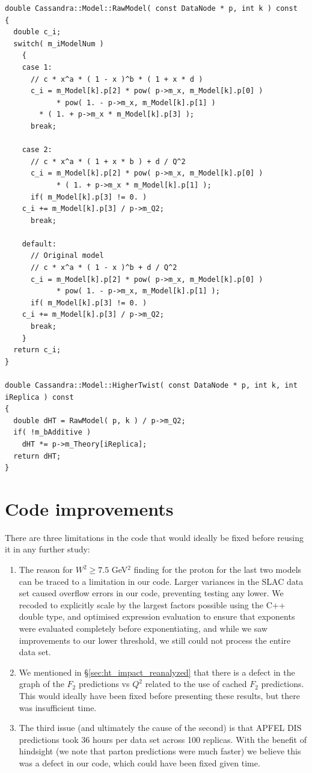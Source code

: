 \documentclass[12pt,a4paper]{report}
\begin{document}
\begin{Verbatim}[fontsize=\small]
double Cassandra::Model::RawModel( const DataNode * p, int k ) const
{
  double c_i;
  switch( m_iModelNum )
    {
    case 1:
      // c * x^a * ( 1 - x )^b * ( 1 + x * d )
      c_i = m_Model[k].p[2] * pow( p->m_x, m_Model[k].p[0] )
            * pow( 1. - p->m_x, m_Model[k].p[1] )
	    * ( 1. + p->m_x * m_Model[k].p[3] );
      break;

    case 2:
      // c * x^a * ( 1 + x * b ) + d / Q^2
      c_i = m_Model[k].p[2] * pow( p->m_x, m_Model[k].p[0] )
            * ( 1. + p->m_x * m_Model[k].p[1] );
      if( m_Model[k].p[3] != 0. )
	c_i += m_Model[k].p[3] / p->m_Q2;
      break;

    default:
      // Original model
      // c * x^a * ( 1 - x )^b + d / Q^2
      c_i = m_Model[k].p[2] * pow( p->m_x, m_Model[k].p[0] )
            * pow( 1. - p->m_x, m_Model[k].p[1] );
      if( m_Model[k].p[3] != 0. )
	c_i += m_Model[k].p[3] / p->m_Q2;
      break;
    }
  return c_i;
}

double Cassandra::Model::HigherTwist( const DataNode * p, int k, int iReplica ) const
{
  double dHT = RawModel( p, k ) / p->m_Q2;
  if( !m_bAdditive )
    dHT *= p->m_Theory[iReplica];
  return dHT;
}
\end{Verbatim}

\section{Code improvements} \label{results_disc_code}

There are three limitations in the code that would ideally be fixed before reusing it in any further study:
\begin{enumerate}
\item The reason for $W^2 \ge 7.5$ GeV$^2$ finding for the proton for the last two models can be traced to a limitation in our code. Larger variances in the SLAC data set caused overflow errors in our code, preventing testing any lower. We recoded to explicitly scale by the largest factors possible using the C++ double type, and optimised expression evaluation to ensure that exponents were evaluated completely before exponentiating, and while we saw improvements to our lower threshold, we still could not process the entire data set.
\item We mentioned in \S \ref{sec:ht_impact_reanalyzed} that there is a defect in the graph of the $F_2$ predictions vs $Q^2$ related to the use of cached $F_2$ predictions. This would ideally have been fixed before presenting these results, but there was insufficient time.
\item The third issue (and ultimately the cause of the second) is that APFEL DIS predictions took 36 hours per data set across 100 replicas. With the benefit of hindsight (we note that parton predictions were much faster) we believe this was a defect in our code, which could have been fixed given time.
\end{enumerate}
\end{document}
